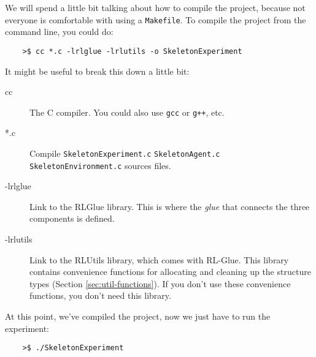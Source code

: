 \documentclass[11pt]{article}
\begin{document}
We will spend a little bit talking about how to compile the project, because not everyone is comfortable with using a \texttt{Makefile}.  To compile
the project from the command line, you could do:
\begin{verbatim}
	>$ cc *.c -lrlglue -lrlutils -o SkeletonExperiment
\end{verbatim}

It might be useful to break this down a little bit:
\begin{description}
\item [cc] The C compiler.  You could also use \texttt{gcc} or \texttt{g++}, etc.
\item [*.c] Compile \texttt{SkeletonExperiment.c} \texttt{SkeletonAgent.c} \texttt{SkeletonEnvironment.c} sources files.
\item [-lrlglue] Link to the RLGlue library.  This is where the \textit{glue} that connects the three components is defined.
\item [-lrlutils] Link to the RLUtils library, which comes with RL-Glue.  This library contains convenience functions for allocating and cleaning up the structure types (Section \ref{sec:util-functions}).  If you 
don't use these convenience functions, you don't need this library.
\end{description}


At this point, we've compiled the project, now we just have to run the experiment:
\begin{verbatim}
	>$ ./SkeletonExperiment
\end{verbatim}
\end{document}
